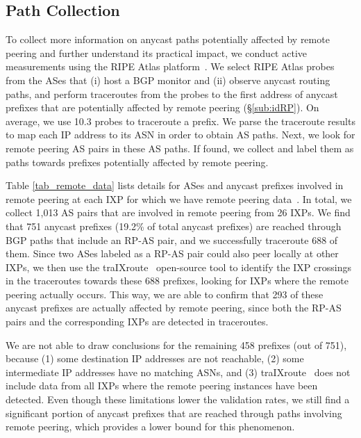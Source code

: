 \subsection{Path Collection}
To collect more information on anycast paths potentially affected by remote peering and further understand its practical impact, we conduct active measurements using the RIPE Atlas platform~\cite{RIPE_Atlas}. We select RIPE Atlas probes from the ASes that (i) host a BGP monitor and (ii) observe anycast routing paths, and perform traceroutes from the probes to the first address of anycast prefixes that are potentially affected by remote peering (\S\ref{sub:idRP}).
On average, we use 10.3 probes to traceroute a prefix. We parse the traceroute results to map each IP address to its ASN in order to obtain AS paths. Next, we look for remote peering AS pairs in these AS paths. If found, we collect and label them as paths towards prefixes potentially affected by remote peering. 

Table \ref{tab_remote_data} lists details for ASes and anycast prefixes involved
in remote peering at each IXP for which we have remote peering
data~\cite{RPJedi}. In total, we collect 1,013 AS pairs that are involved in
remote peering from 26 IXPs. We find that 751 anycast prefixes (19.2\% of total
anycast prefixes) are reached through BGP paths that include an RP-AS pair, and
we successfully traceroute 688 of them.  Since two ASes labeled as a RP-AS pair
could also peer locally at other IXPs, we then use the
traIXroute~\cite{traixroute, traixroute:pam} open-source tool to identify the
IXP crossings in the traceroutes towards these 688 prefixes, looking for IXPs
where the remote peering actually occurs. This way, we are able to confirm that
293 of these anycast prefixes are actually affected by remote peering, since
both the RP-AS pairs and the corresponding IXPs are detected in traceroutes.

We are not able to draw conclusions for the remaining 458 prefixes (out of 751), because
(1) some destination IP addresses are not reachable, (2) some intermediate IP addresses have no matching ASNs, and  (3) traIXroute~\cite{traixroute} does not include data from all IXPs where the remote peering instances have been detected. Even though these limitations lower the validation rates, we still find a significant portion of anycast prefixes that are reached through paths involving remote peering, which provides a lower bound for this phenomenon.

